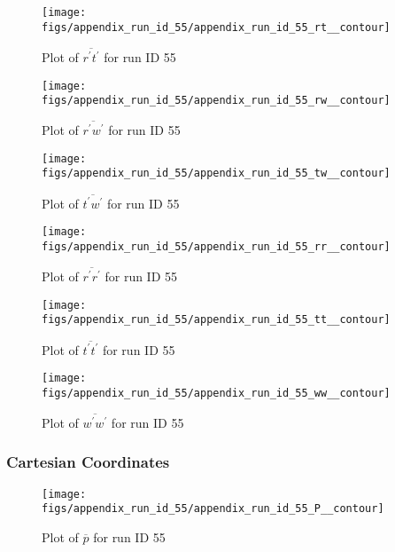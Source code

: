 \begin{figure}[H]
\centering
\texttt{[image: figs/appendix\_run\_id\_55/appendix\_run\_id\_55\_rt\_\_contour]}
\caption{Plot of $\overline{r^\prime t^\prime}$ for run ID 55}
\label{fig:appendix_run_id_55_rt__contour}
\end{figure}


\begin{figure}[H]
\centering
\texttt{[image: figs/appendix\_run\_id\_55/appendix\_run\_id\_55\_rw\_\_contour]}
\caption{Plot of $\overline{r^\prime w^\prime}$ for run ID 55}
\label{fig:appendix_run_id_55_rw__contour}
\end{figure}


\begin{figure}[H]
\centering
\texttt{[image: figs/appendix\_run\_id\_55/appendix\_run\_id\_55\_tw\_\_contour]}
\caption{Plot of $\overline{t^\prime w^\prime}$ for run ID 55}
\label{fig:appendix_run_id_55_tw__contour}
\end{figure}


\begin{figure}[H]
\centering
\texttt{[image: figs/appendix\_run\_id\_55/appendix\_run\_id\_55\_rr\_\_contour]}
\caption{Plot of $\overline{r^\prime r^\prime}$ for run ID 55}
\label{fig:appendix_run_id_55_rr__contour}
\end{figure}


\begin{figure}[H]
\centering
\texttt{[image: figs/appendix\_run\_id\_55/appendix\_run\_id\_55\_tt\_\_contour]}
\caption{Plot of $\overline{t^\prime t^\prime}$ for run ID 55}
\label{fig:appendix_run_id_55_tt__contour}
\end{figure}


\begin{figure}[H]
\centering
\texttt{[image: figs/appendix\_run\_id\_55/appendix\_run\_id\_55\_ww\_\_contour]}
\caption{Plot of $\overline{w^\prime w^\prime}$ for run ID 55}
\label{fig:appendix_run_id_55_ww__contour}
\end{figure}


\subsubsection{Cartesian Coordinates}
\begin{figure}[H]
\centering
\texttt{[image: figs/appendix\_run\_id\_55/appendix\_run\_id\_55\_P\_\_contour]}
\caption{Plot of $\overline{p}$ for run ID 55}
\label{fig:appendix_run_id_55_P__contour}
\end{figure}


